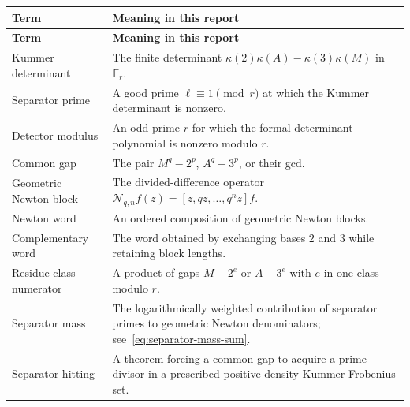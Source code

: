 \documentclass[11pt,oneside]{article}
\theoremstyle{definition}
\theoremstyle{remark}
\newcommand{\F}{\mathbb F}
\begin{document}
\begin{longtable}{>{\raggedright\arraybackslash}p{}p{}}
\toprule
\textbf{Term} & \textbf{Meaning in this report} \\
\midrule
\endfirsthead
\toprule
\textbf{Term} & \textbf{Meaning in this report} \\
\midrule
\endhead
Kummer determinant & The finite determinant
$\kappa(2)\kappa(A)-\kappa(3)\kappa(M)$ in $\F_r$. \\
Separator prime & A good prime $\ell\equiv1\pmod r$ at which the Kummer determinant is
nonzero. \\
Detector modulus & An odd prime $r$ for which the formal determinant polynomial is nonzero
modulo $r$. \\
Common gap & The pair $M^q-2^p$, $A^q-3^p$, or their gcd. \\
Geometric Newton block & The divided-difference operator
$\mathcal N_{q,n}f(z)=[z,qz,\ldots,q^nz]f$. \\
Newton word & An ordered composition of geometric Newton blocks. \\
Complementary word & The word obtained by exchanging bases $2$ and $3$ while retaining block
lengths. \\
Residue-class numerator & A product of gaps $M-2^e$ or $A-3^e$ with $e$ in one class modulo
$r$. \\
Separator mass & The logarithmically weighted contribution of separator primes to geometric
Newton denominators; see~\eqref{eq:separator-mass-sum}. \\
Separator-hitting & A theorem forcing a common gap to acquire a prime divisor in a prescribed
positive-density Kummer Frobenius set. \\
\bottomrule
\end{longtable}
\end{document}
